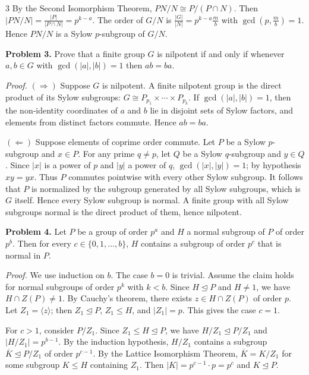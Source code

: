 \documentclass[10pt,landscape]{article}
\begin{document}
\begin{multicols}{3}
By the Second Isomorphism Theorem, \(PN/N\cong P/(P\cap N)\). Then \(|PN/N|=\frac{|P|}{|P\cap N|}=p^{k-a}\). The order of \(G/N\) is \(\frac{|G|}{|N|}=p^{k-a}\frac{m}{b}\) with \(\gcd(p,\frac{m}{b})=1\). Hence \(PN/N\) is a Sylow \(p\)-subgroup of \(G/N\).

\noindent\textbf{Problem 3.} Prove that a finite group \(G\) is nilpotent if and only if whenever \(a,b\in G\) with \(\gcd(|a|,|b|)=1\) then \(ab=ba\).

\textit{Proof.} \((\Rightarrow)\) Suppose \(G\) is nilpotent. A finite nilpotent group is the direct product of its Sylow subgroups: \(G\cong P_{p_1}\times\cdots\times P_{p_k}\). If \(\gcd(|a|,|b|)=1\), then the non‑identity coordinates of \(a\) and \(b\) lie in disjoint sets of Sylow factors, and elements from distinct factors commute. Hence \(ab=ba\).

\((\Leftarrow)\) Suppose elements of coprime order commute. Let \(P\) be a Sylow \(p\)-subgroup and \(x\in P\). For any prime \(q\neq p\), let \(Q\) be a Sylow \(q\)-subgroup and \(y\in Q\). Since \(|x|\) is a power of \(p\) and \(|y|\) a power of \(q\), \(\gcd(|x|,|y|)=1\); by hypothesis \(xy=yx\). Thus \(P\) commutes pointwise with every other Sylow subgroup. It follows that \(P\) is normalized by the subgroup generated by all Sylow subgroups, which is \(G\) itself. Hence every Sylow subgroup is normal. A finite group with all Sylow subgroups normal is the direct product of them, hence nilpotent.

\noindent\textbf{Problem 4.} Let \(P\) be a group of order \(p^a\) and \(H\) a normal subgroup of \(P\) of order \(p^b\). Then for every \(c\in\{0,1,\dots,b\}\), \(H\) contains a subgroup of order \(p^c\) that is normal in \(P\).

\textit{Proof.} We use induction on \(b\). The case \(b=0\) is trivial. Assume the claim holds for normal subgroups of order \(p^k\) with \(k<b\). Since \(H\trianglelefteq P\) and \(H\neq1\), we have \(H\cap Z(P)\neq1\). By Cauchy's theorem, there exists \(z\in H\cap Z(P)\) of order \(p\). Let \(Z_1=\langle z\rangle\); then \(Z_1\trianglelefteq P\), \(Z_1\le H\), and \(|Z_1|=p\). This gives the case \(c=1\).

For \(c>1\), consider \(P/Z_1\). Since \(Z_1\le H\trianglelefteq P\), we have \(H/Z_1\trianglelefteq P/Z_1\) and \(|H/Z_1|=p^{b-1}\). By the induction hypothesis, \(H/Z_1\) contains a subgroup \(\overline{K}\trianglelefteq P/Z_1\) of order \(p^{c-1}\). By the Lattice Isomorphism Theorem, \(\overline{K}=K/Z_1\) for some subgroup \(K\le H\) containing \(Z_1\). Then \(|K|=p^{c-1}\cdot p=p^c\) and \(K\trianglelefteq P\). 


\end{multicols}
\end{document}

